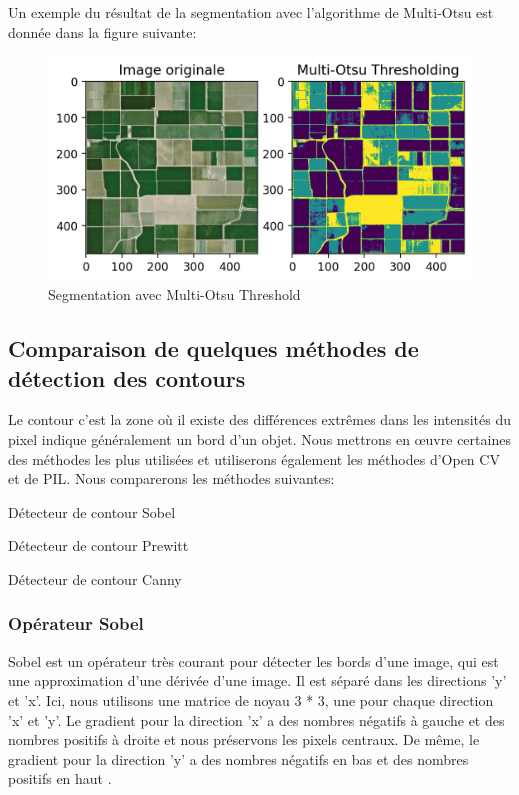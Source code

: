 \documentclass[12pt, openany]{report}
\begin{document}
Un exemple du résultat de la segmentation avec l'algorithme de Multi-Otsu est donnée dans la figure suivante:

\begin{figure}[H]
\centering
\includegraphics[scale=1.2]{osupng.png}
\caption{Segmentation avec Multi-Otsu Threshold}
\end{figure}

\subsection{Comparaison de quelques méthodes de détection des contours}
Le contour c’est la zone où il existe des différences extrêmes dans les intensités du pixel indique généralement un bord d'un objet.
Nous mettrons en œuvre certaines des méthodes les plus utilisées et utiliserons également les méthodes d'Open CV et de PIL.
\noindent Nous comparerons les méthodes suivantes:
\begin{mylist}
\item Détecteur de contour Sobel
\item Détecteur de contour Prewitt
\item Détecteur de contour Canny
\end{mylist}

\subsubsection{Opérateur Sobel}
Sobel est un opérateur très courant pour détecter les bords d'une image, qui est une approximation d'une dérivée d'une image. Il est séparé dans les directions 'y' et 'x'. Ici, nous utilisons une matrice de noyau 3 * 3, une pour chaque direction 'x' et 'y'. Le gradient pour la direction 'x' a des nombres négatifs à gauche et des nombres positifs à droite et nous préservons les pixels centraux. De même, le gradient pour la direction 'y' a des nombres négatifs en bas et des nombres positifs en haut .
\end{document}
